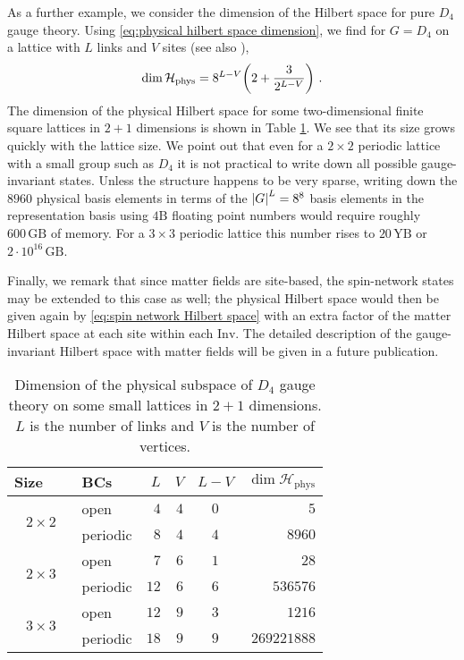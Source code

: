 \medskip

As a further example, we consider the dimension of the Hilbert space for pure $D_4$ gauge theory.
Using \eqref{eq:physical hilbert space dimension}, we find for $G=D_4$ on a lattice with $L$ links and $V$ sites (see also \cite{marchesethesis}),
\begin{equation}
    \dim{\mathcal{H}_{\mathrm{phys}}} = 8^{L-V}\pqty{2+\frac{3}{2^{L-V}}} \ .
\end{equation}
The dimension of the physical Hilbert space for some two-dimensional finite square lattices in $2+1$ dimensions is shown in Table \ref{tab:numstates}. We see that its size grows quickly with the lattice size. We point out that even for a $2 \times 2$ periodic lattice with a small group such as $D_4$ it is not practical to write down all possible gauge-invariant states. Unless the structure happens to be very sparse, writing down the $8960$ physical basis elements in terms of the $\abs{G}^L = 8^8$ basis elements in the representation basis using $4 \mathrm{B}$ floating point numbers would require roughly $600 \,\mathrm{GB}$ of memory. For a  $3 \times 3$ periodic lattice this number rises to $20\, \mathrm{YB}$ or $2 \cdot 10^{16}\, \mathrm{GB}$.


Finally, we remark that since matter fields are site-based, the spin-network states may be extended to this case as well; the physical Hilbert space would then be given again by \eqref{eq:spin network Hilbert space} with an extra factor of the matter Hilbert space at each site within each $\mathrm{Inv}$. The detailed description of the gauge-invariant Hilbert space with matter fields will be given in a future publication.


\begin{table}[t]
    \centering
    \begin{tabular}{clrrcr}
        \toprule
        Size~~~ & BCs & $L$ & $V$ & $L-V$ &$\dim{\mathcal{H}_{\mathrm{phys}}}$\\
        \midrule
        \multirow{2}{3em}{$2 \times 2$}
            & open & $4$ & $4$ & $0$ & $5$\\
            & periodic & $8$ & $4$ & $4$ & $8960$ \\[5pt]
        \multirow{2}{3em}{$2 \times 3$}
            & open & $7$ & $6$ & $1$ & $28$ \\
            & periodic & $12$ & $6$ & $6$ & $536576$ \\[5pt]
        \multirow{2}{3em}{$3 \times 3$}
            & open & $12$ & $9$ & $3$ & $1216$ \\
            & periodic & $18$ & $9$ & $9$ & $269221888$ \\
        \bottomrule
    \end{tabular}
    \caption{Dimension of the physical subspace of $D_4$ gauge theory on some small lattices in $2+1$ dimensions. $L$ is the number of links and $V$ is the number of vertices.}
    \label{tab:numstates}
\end{table}



